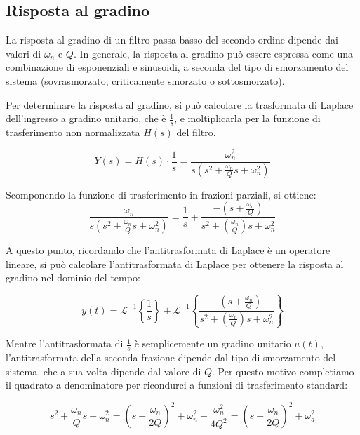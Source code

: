 \subsection{Risposta al gradino}

La risposta al gradino di un filtro passa-basso del secondo ordine dipende dai valori di $\omega_n$ e $Q$. In generale, la risposta al gradino può essere espressa come una combinazione di esponenziali e sinusoidi, a seconda del tipo di smorzamento del sistema (sovrasmorzato, criticamente smorzato o sottosmorzato).

Per determinare la risposta al gradino, si può calcolare la trasformata di Laplace dell'ingresso a gradino unitario, che è $\frac{1}{s}$, e moltiplicarla per la funzione di trasferimento non normalizzata $H(s)$ del filtro. 

\begin{equation}
    Y(s) = H(s) \cdot \frac{1}{s} = \frac{\omega_n^2}{s\left(s^2 + \frac{\omega_n}{Q}s + \omega_n^2\right)}
    \label{eq: risposta gradino LP}
\end{equation}

Scomponendo la funzione di trasferimento in frazioni parziali, si ottiene:
\begin{equation}
    \frac{\omega_n}{s\left(s^2 + \frac{\omega_n}{Q}s + \omega_n^2\right)} = \frac{1}{s} + \frac{-\left(s + \frac{\omega_n}{Q}\right)}{s^2 + \left(\frac{\omega_n}{Q}\right)s + \omega_n^2}
    \label{eq: frazioni parziali LP}
\end{equation}

A questo punto, ricordando che l'antitrasformata di Laplace è un operatore lineare, si può calcolare l'antitrasformata di Laplace per ottenere la risposta al gradino nel dominio del tempo: 

\begin{equation}
    y(t) = \mathcal{L}^{-1}\left\{\frac{1}{s}\right\} + \mathcal{L}^{-1}\left\{\frac{-\left(s + \frac{\omega_n}{Q}\right)}{s^2 + \left(\frac{\omega_n}{Q}\right)s + \omega_n^2}\right\}
    \label{eq: antitrasformata frazioni LP}
\end{equation}

Mentre l'antitrasformata di $\frac{1}{s}$ è semplicemente un gradino unitario $u(t)$, l'antitrasformata della seconda frazione dipende dal tipo di smorzamento del sistema, che a sua volta dipende dal valore di $Q$. Per questo motivo completiamo il quadrato a denominatore per ricondurci a funzioni di trasferimento standard:

\begin{equation}
    s^2 + \frac{\omega_n}{Q}s + \omega_n^2 = \left(s + \frac{\omega_n}{2Q}\right)^2 + \omega_n^2 - \frac{\omega_n^2}{4Q^2} = \left(s + \frac{\omega_n}{2Q}\right)^2 + \omega_d^2
    \label{eq: somma tra quadrati LP}
\end{equation}

